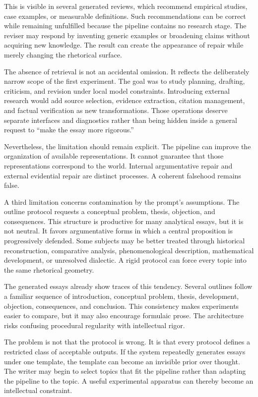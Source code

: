 \documentclass[11pt]{article}
\begin{document}
This is visible in several generated reviews, which recommend empirical studies, case examples, or measurable definitions. Such recommendations can be correct while remaining unfulfilled because the pipeline contains no research stage. The reviser may respond by inventing generic examples or broadening claims without acquiring new knowledge. The result can create the appearance of repair while merely changing the rhetorical surface.

The absence of retrieval is not an accidental omission. It reflects the deliberately narrow scope of the first experiment. The goal was to study planning, drafting, criticism, and revision under local model constraints. Introducing external research would add source selection, evidence extraction, citation management, and factual verification as new transformations. Those operations deserve separate interfaces and diagnostics rather than being hidden inside a general request to ``make the essay more rigorous.''

Nevertheless, the limitation should remain explicit. The pipeline can improve the organization of available representations. It cannot guarantee that those representations correspond to the world. Internal argumentative repair and external evidential repair are distinct processes. A coherent falsehood remains false.

A third limitation concerns contamination by the prompt's assumptions. The outline protocol requests a conceptual problem, thesis, objection, and consequences. This structure is productive for many analytical essays, but it is not neutral. It favors argumentative forms in which a central proposition is progressively defended. Some subjects may be better treated through historical reconstruction, comparative analysis, phenomenological description, mathematical development, or unresolved dialectic. A rigid protocol can force every topic into the same rhetorical geometry.

The generated essays already show traces of this tendency. Several outlines follow a familiar sequence of introduction, conceptual problem, thesis, development, objection, consequences, and conclusion. This consistency makes experiments easier to compare, but it may also encourage formulaic prose. The architecture risks confusing procedural regularity with intellectual rigor.

The problem is not that the protocol is wrong. It is that every protocol defines a restricted class of acceptable outputs. If the system repeatedly generates essays under one template, the template can become an invisible prior over thought. The writer may begin to select topics that fit the pipeline rather than adapting the pipeline to the topic. A useful experimental apparatus can thereby become an intellectual constraint.
\end{document}

